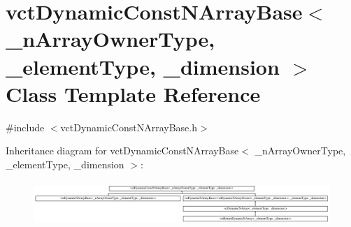 \hypertarget{classvct_dynamic_const_n_array_base}{\section{vct\-Dynamic\-Const\-N\-Array\-Base$<$ \-\_\-n\-Array\-Owner\-Type, \-\_\-element\-Type, \-\_\-dimension $>$ Class Template Reference}
\label{classvct_dynamic_const_n_array_base}
}


{\ttfamily \#include $<$vct\-Dynamic\-Const\-N\-Array\-Base.\-h$>$}

Inheritance diagram for vct\-Dynamic\-Const\-N\-Array\-Base$<$ \-\_\-n\-Array\-Owner\-Type, \-\_\-element\-Type, \-\_\-dimension $>$\-:\begin{figure}[H]
\begin{center}
\leavevmode
\includegraphics[height=1.699545cm]{dd/d8c/classvct_dynamic_const_n_array_base}
\end{center}
\end{figure}
